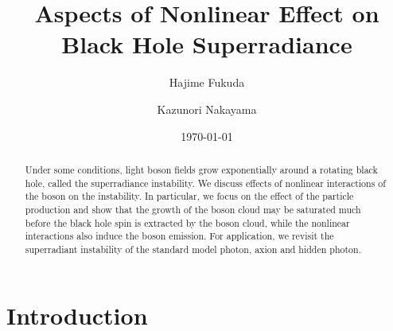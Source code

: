 \documentclass[%
 preprint,
 nofootinbib,
 amsmath,amssymb,
 aps,
 a4paper
]{revtex4-1}
\begin{document}

\title{Aspects of Nonlinear Effect on Black Hole Superradiance}

\author{Hajime Fukuda}

\author{Kazunori Nakayama}%
%
%


\date{\today}%

\begin{abstract}

Under some conditions, light boson fields grow exponentially around a rotating black hole, called the superradiance instability. We discuss effects of nonlinear interactions of the boson on the instability. In particular, we focus on the effect of the particle production and show that the growth of the boson cloud may be saturated much before the black hole spin is extracted by the boson cloud, while the nonlinear interactions also induce the boson emission. For application, we revisit the superradiant instability of the standard model photon, axion and hidden photon. 

\end{abstract}

\maketitle


\section{Introduction}
\end{document}
